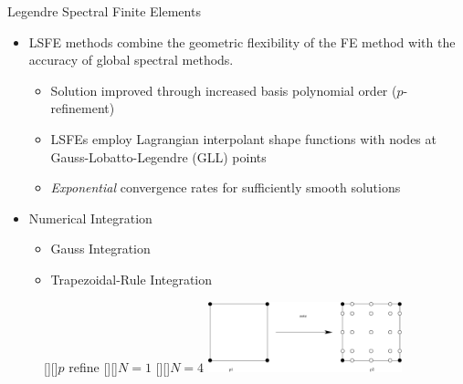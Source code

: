 \documentclass[xcolor=cmyk]{beamer}
\begin{document}
\begin{frame}{Legendre Spectral Finite Elements}
\normalsize

\begin{itemize}
\item
LSFE methods combine the geometric flexibility of
the FE method with the accuracy of global spectral methods.
%
\begin{itemize}
%
   \item Solution improved through increased basis polynomial order
($p$-refinement)
%
    \item LSFEs employ Lagrangian interpolant shape functions with nodes at
Gauss-Lobatto-Legendre (GLL) points 
%
  \item \textit{Exponential} convergence rates for sufficiently
smooth solutions

\end{itemize}
%

\item Numerical Integration
    \begin{itemize}
        \item Gauss Integration
        \item Trapezoidal-Rule Integration
    \end{itemize}

\end{itemize}

\begin{figure}[h!tp]
   [][]{$p$ refine}
   [][]{$N=1$}
   [][]{$N=4$}
   \includegraphics[width=0.5\textwidth,clip]{figs/refine.eps}
\end{figure}


\end{frame}
\end{document}
